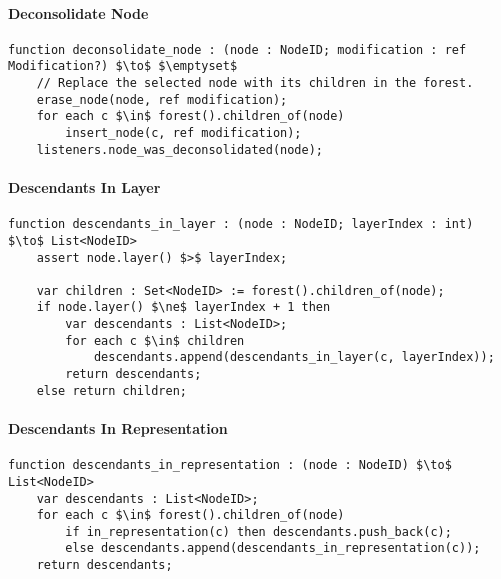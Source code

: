 \paragraph{Deconsolidate Node}

\begin{stulisting}[H]
\caption{Selection : Deconsolidate Node Implementation}
\begin{lstlisting}[style=Default]
function deconsolidate_node : (node : NodeID; modification : ref Modification?) $\to$ $\emptyset$
	// Replace the selected node with its children in the forest.
	erase_node(node, ref modification);
	for each c $\in$ forest().children_of(node)
		insert_node(c, ref modification);
	listeners.node_was_deconsolidated(node);
\end{lstlisting}
\end{stulisting}

\paragraph{Descendants In Layer}

\begin{stulisting}[H]
\caption{Selection : Descendants In Layer Implementation}
\begin{lstlisting}[style=Default]
function descendants_in_layer : (node : NodeID; layerIndex : int) $\to$ List<NodeID>
	assert node.layer() $>$ layerIndex;

	var children : Set<NodeID> := forest().children_of(node);
	if node.layer() $\ne$ layerIndex + 1 then
		var descendants : List<NodeID>;
		for each c $\in$ children
			descendants.append(descendants_in_layer(c, layerIndex));
		return descendants;
	else return children;
\end{lstlisting}
\end{stulisting}

\paragraph{Descendants In Representation}

\begin{stulisting}[H]
\caption{Selection : Descendants In Representation Implementation}
\begin{lstlisting}[style=Default]
function descendants_in_representation : (node : NodeID) $\to$ List<NodeID>
	var descendants : List<NodeID>;
	for each c $\in$ forest().children_of(node)
		if in_representation(c) then descendants.push_back(c);
		else descendants.append(descendants_in_representation(c));
	return descendants;
\end{lstlisting}
\end{stulisting}

